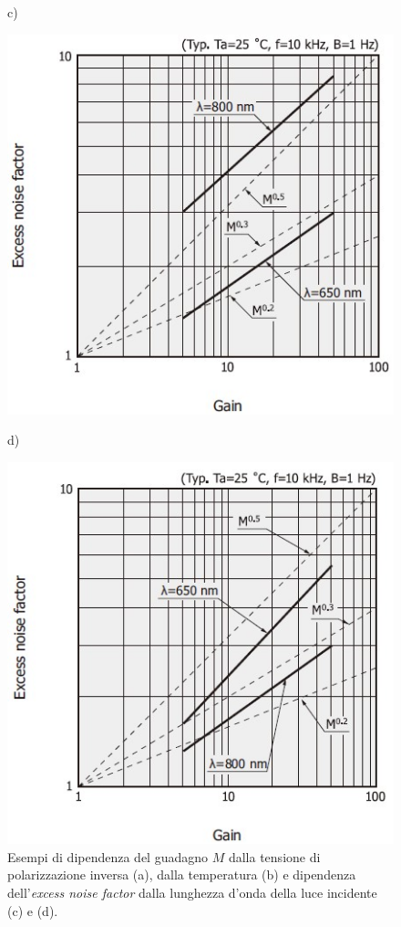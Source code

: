 \begin{figure}[tbh]
\begin{minipage}{.45\textwidth}
	\end{minipage}
	c)
	\begin{minipage}{.45\textwidth}
		\includegraphics[width=\linewidth]{./ImageFiles/apd_wave1.jpg}
	\end{minipage}
	d)
	\begin{minipage}{.45\textwidth}
		\includegraphics[width=\linewidth]{./ImageFiles/apd_wave2.jpg}
	\end{minipage}
	\caption{Esempi di dipendenza del guadagno $M$ dalla tensione di polarizzazione inversa (a), dalla temperatura (b) e dipendenza dell'\textit{excess noise factor} dalla lunghezza d'onda della luce incidente (c) e (d)\cite{HAMAMATSU2021}.}
	\label{fig:apd_gain}
\end{figure}
